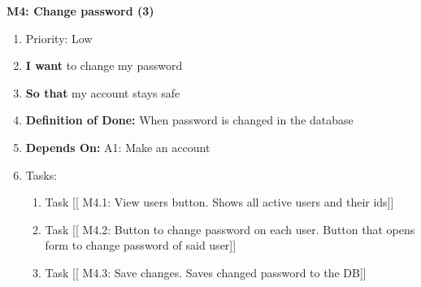 \vspace{2em}

\textbf{M4: Change password (3)}
\begin{enumerate}
    \item Priority: Low
    \item \textbf{I want} to change my password
    \item \textbf{So that} my account stays safe
    \item \textbf{Definition of Done:} When password is changed in the database
    \item \textbf{Depends On:} A1: Make an account
    \item Tasks:
    \begin{enumerate}
        \item Task [[ M4.1: View users button. Shows all active users and their ids]]
        \item Task [[ M4.2: Button to change password on each user. Button that opens form to change password of said user]]
        \item Task [[ M4.3: Save changes. Saves changed password to the DB]]
    \end{enumerate}
\end{enumerate}